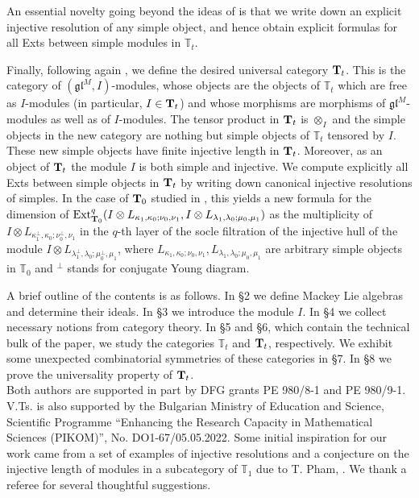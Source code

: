 \documentclass[12pt]{article}
\def\TT {{\mathbb T}}     %
\def\mk {\mathfrak}
\begin{document}
An essential novelty going beyond the ideas of \cite{Chirvasitu-Penkov-UTC} is that we write down an explicit injective resolution of any simple object, and hence obtain explicit formulas for all Exts between simple modules in $\TT_{t}$.

Finally, following again \cite{Chirvasitu-Penkov-UTC}, we define the desired universal category ${\bf T}_{t}$. This is the category of $(\mk{gl}^M,I)$-modules, whose objects are the objects of $\TT_{t}$ which are free as $I$-modules (in particular, $I\in {\bf T}_{t}$) and whose morphisms are morphisms of $\mk{gl}^M$-modules as well as of $I$-modules. The tensor product in ${\bf T}_{t}$ is $\otimes_I$ and the simple objects in the new category are nothing but simple objects of $\TT_{t}$ tensored by $I$. These new simple objects have finite injective length in ${\bf T}_t$. Moreover, as an object of ${\bf T}_{t}$ the module $I$ is both simple and injective. We compute explicitly all Exts between simple objects in ${\bf T}_{t}$ by writing down canonical injective resolutions of simples. In the case of ${\bf T}_{0}$ studied in \cite{Chirvasitu-Penkov-UTC}, this yields a new formula for the dimension of ${\rm Ext}_{{\bf T}_0}^{q}(I\otimes L_{\kappa_1,\kappa_0;\nu_0,\nu_1},I\otimes L_{\lambda_1,\lambda_0;\mu_0,\mu_1})$ as the multiplicity of $I\otimes L_{\kappa_1^\perp,\kappa_0;\nu_0^\perp,\nu_1}$ in the $q$-th layer of the socle filtration of the injective hull of the module $I\otimes L_{\lambda_1^\perp,\lambda_0;\mu_0^\perp,\mu_1}$, where $L_{\kappa_1,\kappa_0;\nu_0,\nu_1},L_{\lambda_1,\lambda_0;\mu_0,\mu_1}$ are arbitrary simple objects in $\TT_{0}$ and ${^\perp}$ stands for conjugate Young diagram.

A brief outline of the contents is as follows. In \S2 we define Mackey Lie algebras and determine their ideals. In \S3 we introduce the module $I$. In \S4 we collect necessary notions from category theory. In \S5 and \S6, which contain the technical bulk of the paper, we study the categories $\TT_t$ and ${\bf T}_t$, respectively. We exhibit some unexpected combinatorial symmetries of these categories in \S7. In \S8 we prove the universality property of ${\bf T}_t$.\\


 Both authors are supported in part by DFG grants PE 980/8-1 and PE 980/9-1. V.Ts. is also supported by the Bulgarian Ministry of Education and Science, Scientific Programme ``Enhancing the Research Capacity in Mathematical Sciences (PIKOM)'', No. DO1-67/05.05.2022. Some initial inspiration for our work came from a set of examples of injective resolutions and a conjecture on the injective length of modules in a subcategory of $\TT_{1}$ due to T. Pham, \cite{Pham}. We thank a referee for several thoughtful suggestions. 
\end{document}
